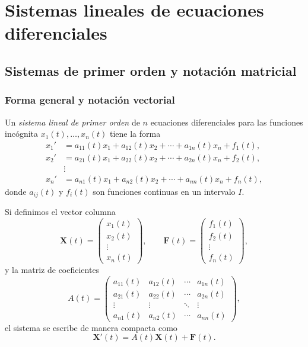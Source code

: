 \chapter{Sistemas lineales de ecuaciones diferenciales}\label{sistemasedos}

\section{Sistemas de primer orden y notación matricial}

\subsection{Forma general y notación vectorial}

Un \emph{sistema lineal de primer orden} de $n$ ecuaciones diferenciales para las funciones incógnita $x_1(t),\dots,x_n(t)$ tiene la forma
\begin{equation}
\begin{aligned}
x_1' &= a_{11}(t)x_1 + a_{12}(t)x_2 + \cdots + a_{1n}(t)x_n + f_1(t),\\
x_2' &= a_{21}(t)x_1 + a_{22}(t)x_2 + \cdots + a_{2n}(t)x_n + f_2(t),\\
&\vdots\\
x_n' &= a_{n1}(t)x_1 + a_{n2}(t)x_2 + \cdots + a_{nn}(t)x_n + f_n(t),
\end{aligned}
\end{equation}
donde $a_{ij}(t)$ y $f_i(t)$ son funciones continuas en un intervalo $I$.

Si definimos el vector columna
\[
\mathbf{X}(t)=
\begin{pmatrix}
x_1(t)\\x_2(t)\\\vdots\\x_n(t)
\end{pmatrix},\qquad
\mathbf{F}(t)=
\begin{pmatrix}
f_1(t)\\f_2(t)\\\vdots\\f_n(t)
\end{pmatrix},
\]
y la matriz de coeficientes
\[
A(t)=
\begin{pmatrix}
a_{11}(t)&a_{12}(t)&\cdots&a_{1n}(t)\\
a_{21}(t)&a_{22}(t)&\cdots&a_{2n}(t)\\
\vdots&\vdots&\ddots&\vdots\\
a_{n1}(t)&a_{n2}(t)&\cdots&a_{nn}(t)
\end{pmatrix},
\]
el sistema se escribe de manera compacta como
\begin{equation}
\mathbf{X}'(t)=A(t)\mathbf{X}(t)+\mathbf{F}(t).
\end{equation}

